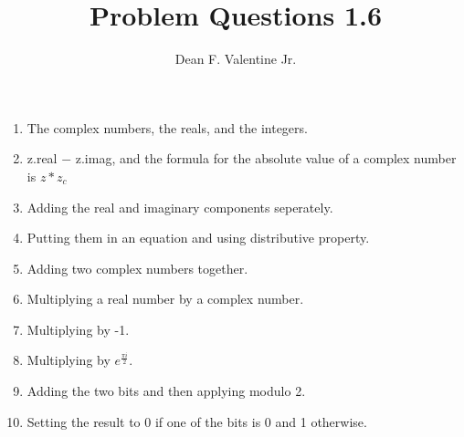 \documentclass{article}
\title{Problem Questions 1.6}
\author{Dean F. Valentine Jr.}
\begin{document}
    \maketitle
    \begin{enumerate}
        \item The complex numbers, the reals, and the integers.
        \item z.real $-$ z.imag, and the formula for the absolute value of a complex number is $z * z_{c}$
        \item Adding the real and imaginary components seperately.
        \item Putting them in an equation and using distributive property.
        \item Adding two complex numbers together.
        \item Multiplying a real number by a complex number.
        \item Multiplying by -1.
        \item Multiplying by $e^{\frac{{\pi}i}{2}}$.
        \item Adding the two bits and then applying modulo 2.
        \item Setting the result to 0 if one of the bits is 0 and 1 otherwise.
    \end{enumerate}
\end{document}
